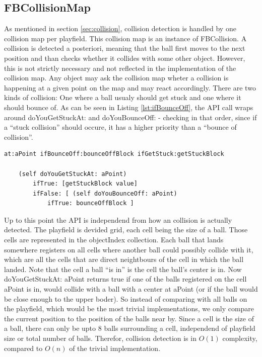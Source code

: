 \subsection{FBCollisionMap}
As mentioned in section
\ref{sec:collision}, 
collision detection is handled by one collision map per playfield. This collision
map is an instance of FBCollision. A collision is detected a posteriori, meaning
that the ball first moves to the next position and  than checks whether it collides
with some other object. However, this is not strictly necessary and not reflected in
the implementation of the collision map. Any object may ask the collision map wheter
a collision is happening at a given point on the map and may react accordingly. There
are two kinds of collision: One where a ball usualy should get stuck and one where it
should bounce of. As can be seen in Listing \ref{lst:ifBounceOff}, the API call wraps
around doYouGetStuckAt: and doYouBounceOff: - checking in that order, since if a ``stuck
collision'' should occure, it has a higher priority than a ``bounce of collision''.
%
\begin{lstlisting}[caption=API method for detecting collision,label=lst:ifBounceOff]
at:aPoint ifBounceOff:bounceOffBlock ifGetStuck:getStuckBlock
	
	(self doYouGetStuckAt: aPoint)
		ifTrue: [getStuckBlock value]
		ifFalse: [ (self doYouBounceOff: aPoint)
			ifTrue: bounceOffBlock ]
\end{lstlisting}
%
Up to this point the API is independend from how an collision is actually detected.
The playfield is devided grid, each cell being the size of a ball. Those cells are represented
in the objectIndex collection. Each ball that lands somewhere registers on all cells where
another ball could possibly collide with it, which are all the cells that are direct neightbours
of the cell in which the ball landed. Note that the cell a ball ``is in'' is the cell the ball's
center is in. Now doYouGetStuckAt: aPoint returns true if one of the balls registered on the
cell aPoint is in, would collide with a ball with a center at aPoint (or if the ball would be
close enough to the upper boder). So instead of comparing with all balls on the playfield, which
would be the most trivial implementations, we only compare the current position to the position
of the balls near by. Since a cell is the size of a ball, there can only be upto 8 balls surrounding
a cell, independend of playfield size or total number of balls. Therefor, collision detection is in
$O(1)$ complexity, compared to $O(n)$ of the trivial implementation.

